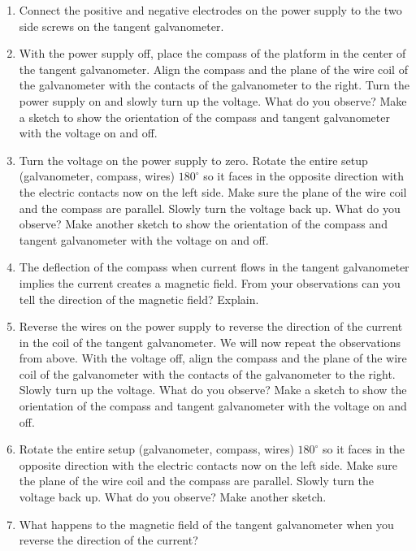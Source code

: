 \begin{enumerate}

\item Connect the positive and negative electrodes on the power supply
to the two side screws on the tangent galvanometer.

\item With the power supply off, place the compass of the platform in the center of
the tangent galvanometer.
Align the compass and the plane of the wire coil of the galvanometer with
the  contacts of the galvanometer to the right.
Turn the power supply on and 
slowly turn up the voltage.
What do you observe?
Make a sketch to show the orientation of the compass and tangent
galvanometer with the voltage on and off.
\vspace{20mm}

\item Turn the voltage on the power supply to zero.
Rotate the entire setup (galvanometer, compass, wires) $180^\circ$
so it faces in the
opposite direction with the electric contacts now on the left side.
Make sure the plane of the wire coil and the compass are parallel.
Slowly turn the voltage back up. What do you observe?
Make another sketch to show the orientation of the compass and tangent
galvanometer with the voltage on and off.
\vspace{20mm}

\item The deflection of the compass when current flows in the tangent 
galvanometer implies the current creates a magnetic field.
From your observations can you tell the direction
of the magnetic field?  Explain.
\vspace{20mm}

\item Reverse the wires on the power supply to reverse the direction
of the current in the coil of the tangent galvanometer.
We will now repeat the observations from above.
With the voltage off, align the compass and the plane of the wire coil of the galvanometer with
the  contacts of the galvanometer to the right.
Slowly turn up the voltage.
What do you observe?
Make a sketch to show the orientation of the compass and tangent
galvanometer with the voltage on and off.
\vspace{20mm}

\item Rotate the entire setup (galvanometer, compass, wires) $180^\circ$
so it faces in the
opposite direction with the electric contacts now on the left side.
Make sure the plane of the wire coil and the compass are parallel.
Slowly turn the voltage back up. What do you observe?
 Make another sketch.
\vspace{20mm}

\item What happens to the magnetic field of the tangent galvanometer
when you reverse the direction of the current?

\end{enumerate}
